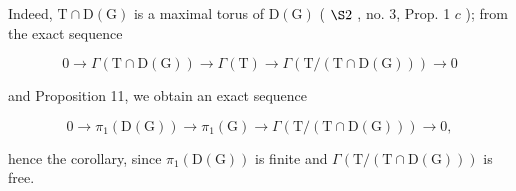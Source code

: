 Indeed, \(\mathrm{T} \cap \mathrm{D}(\mathrm{G})\) is a maximal torus of \(\mathrm{D}(\mathrm{G})\) ( \(\S 2\) , no. 3, Prop. 1 \(c\) ); from the exact sequence

\[
0 \longrightarrow \Gamma (\mathrm{T} \cap \mathrm{D} (\mathrm{G})) \longrightarrow \Gamma (\mathrm{T}) \longrightarrow \Gamma (\mathrm{T} / (\mathrm{T} \cap \mathrm{D} (\mathrm{G}))) \longrightarrow 0
\]

and Proposition 11, we obtain an exact sequence

\[
0 \longrightarrow \pi_ {1} (\mathrm{D} (\mathrm{G})) \longrightarrow \pi_ {1} (\mathrm{G}) \longrightarrow \Gamma (\mathrm{T} / (\mathrm{T} \cap \mathrm{D} (\mathrm{G}))) \longrightarrow 0,
\]

hence the corollary, since \(\pi_{1}(\mathrm{D}(\mathrm{G}))\) is finite and \(\Gamma(\mathrm{T}/(\mathrm{T}\cap\mathrm{D}(\mathrm{G})))\) is free.

